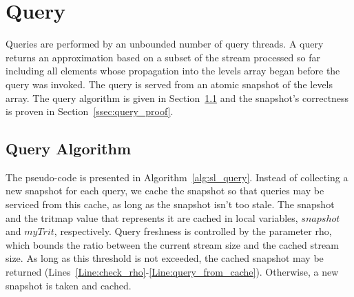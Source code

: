 \section{Query} \label{sec:query} %


Queries are performed by an unbounded number of query threads. A query returns an approximation based on a subset of the stream processed so far including all elements whose propagation into the levels array began before the query was invoked. The query is served from an atomic snapshot of the levels array. The query algorithm is given in Section~\ref{ssec:query_alg} and the snapshot's correctness is proven in Section~\ref{ssec:query_proof}.

\subsection{Query Algorithm} \label{ssec:query_alg} %

The pseudo-code is presented in Algorithm~\ref{alg:sl_query}. Instead of collecting a new snapshot for each query, we cache the snapshot so that queries may be serviced from this cache, as long as the snapshot isn't too stale. The snapshot and the tritmap value that represents it are cached in local variables, $\mathit{snapshot}$ and $\mathit{myTrit}$, respectively. Query freshness is controlled by the parameter \gls{rho}, which bounds the ratio between the current stream size and the cached stream size. As long as this threshold is not exceeded, the cached snapshot may be returned (Lines~\ref{Line:check_rho}-\ref{Line:query_from_cache}). Otherwise, a new snapshot is taken and cached. 


